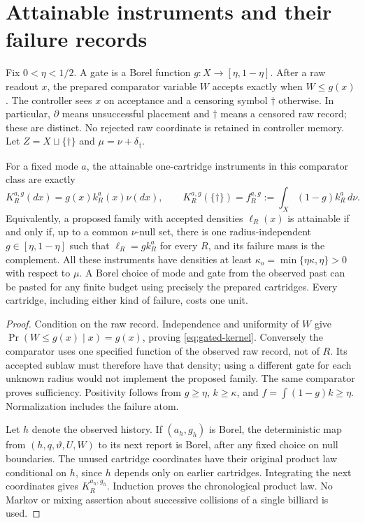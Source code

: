 \section{Attainable instruments and their failure records}\label{sec:attainability}
Fix $0<\eta<1/2$. A gate is a Borel function $g:X\to[\eta,1-\eta]$.
After a raw readout $x$, the prepared comparator variable $W$ accepts exactly
when $W\le g(x)$. The controller sees $x$ on acceptance and a censoring
symbol $\dagger$ otherwise. In particular, $\partial$ means unsuccessful
placement and $\dagger$ means a censored raw record; these are distinct.
No rejected raw coordinate is retained in controller memory. Let
$Z=X\sqcup\{\dagger\}$ and $\mu=\nu+\delta_\dagger$.

\begin{theorem}\label{thm:attainable}
For a fixed mode $a$, the attainable one-cartridge instruments in this
comparator class are exactly
\begin{equation}
 K_R^{a,g}(dx)=g(x)k_R^a(x)\nu(dx),\qquad
 K_R^{a,g}(\{\dagger\})=f_R^{a,g}:=\int_X(1-g)k_R^a\,d\nu.
 \label{eq:gated-kernel}
\end{equation}
Equivalently, a proposed family with accepted densities $\ell_R(x)$ is
attainable if and only if, up to a common $\nu$-null set, there is one
radius-independent $g\in[\eta,1-\eta]$ such that
$\ell_R=gk_R^a$ for every $R$, and its failure mass is the complement.
All these instruments have densities at least
$\kappa_o=\min\{\eta\kappa,\eta\}>0$ with respect to $\mu$.
A Borel choice of mode and gate from the observed past can be pasted for
any finite budget using precisely the prepared cartridges. Every cartridge,
including either kind of failure, costs one unit.
\end{theorem}
\begin{proof}
Condition on the raw record. Independence and uniformity of $W$ give
$\Pr(W\le g(x)\mid x)=g(x)$, proving \eqref{eq:gated-kernel}.
Conversely the comparator uses one specified function of the observed raw
record, not of $R$. Its accepted sublaw must therefore have that density;
using a different gate for each unknown radius would not implement the
proposed family. The same comparator proves sufficiency. Positivity follows
from $g\ge\eta$, $k\ge\kappa$, and
$f=\int(1-g)k\ge\eta$. Normalization includes the failure atom.

Let $h$ denote the observed history. If $(a_h,g_h)$ is Borel, the deterministic
map from $(h,q,\vartheta,U,W)$ to its next report is Borel, after any fixed
choice on null boundaries. The unused cartridge coordinates have their
original product law conditional on $h$, since $h$ depends only on earlier
cartridges. Integrating the next coordinates gives
$K_R^{a_h,g_h}$. Induction proves the chronological product law. No Markov or
mixing assertion about successive collisions of a single billiard is used.
\end{proof}

